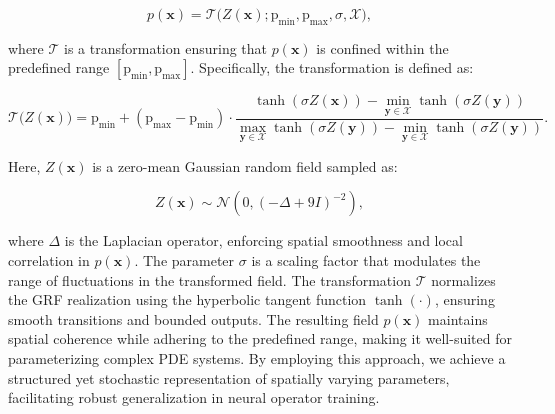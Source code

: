 \begin{equation}
p(\mathbf{x}) = \mathcal{T} \big( Z(\mathbf{x}); \text{p}_{\text{min}}, \text{p}_{\text{max}}, \sigma, \mathcal{X} \big),
\end{equation}

where \( \mathcal{T} \) is a transformation ensuring that \( p(\mathbf{x}) \) is confined within the predefined range \( [\text{p}_{\text{min}}, \text{p}_{\text{max}}] \). Specifically, the transformation is defined as:

\begin{equation}
\mathcal{T} \big( Z(\mathbf{x}) \big) = \text{p}_{\text{min}} + (\text{p}_{\text{max}} - \text{p}_{\text{min}}) \cdot 
\frac{\tanh \left( \sigma Z(\mathbf{x}) \right) - \min\limits_{\mathbf{y} \in \mathcal{X}} \tanh \left( \sigma Z(\mathbf{y}) \right)}
{\max\limits_{\mathbf{y} \in \mathcal{X}} \tanh \left( \sigma Z(\mathbf{y}) \right) - \min\limits_{\mathbf{y} \in \mathcal{X}} \tanh \left( \sigma Z(\mathbf{y}) \right)}.
\end{equation}

Here, \( Z(\mathbf{x}) \) is a zero-mean Gaussian random field sampled as:

\begin{equation}
Z(\mathbf{x}) \sim \mathcal{N} \left( 0, (-\Delta + 9I)^{-2} \right),
\end{equation}

where \( \Delta \) is the Laplacian operator, enforcing spatial smoothness and local correlation in \( p(\mathbf{x}) \). The parameter \( \sigma \) is a scaling factor that modulates the range of fluctuations in the transformed field. The transformation \( \mathcal{T} \) normalizes the GRF realization using the hyperbolic tangent function \( \tanh(\cdot) \), ensuring smooth transitions and bounded outputs. The resulting field \( p(\mathbf{x}) \) maintains spatial coherence while adhering to the predefined range, making it well-suited for parameterizing complex PDE systems. By employing this approach, we achieve a structured yet stochastic representation of spatially varying parameters, facilitating robust generalization in neural operator training.
